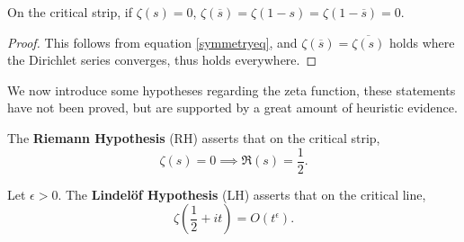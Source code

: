 \begin{corollary}
	On the critical strip, if $\zeta(s)=0$, $\zeta(\overline{s})=\zeta(1-s)=\zeta(1-\overline{s})=0.$
\end{corollary}
\begin{proof}
	This follows from equation \ref{symmetryeq}, and $\zeta(\overline{s})=\overline{\zeta(s)}$ holds where the Dirichlet series converges, thus holds everywhere.
\end{proof}
We now introduce some hypotheses regarding the zeta function, these statements have not been proved, but are supported by a great amount of heuristic evidence.
\begin{definition}
	The \textbf{Riemann Hypothesis} (RH) asserts that on the critical strip, \[
		\zeta(s) = 0 \implies \Re(s) = \frac{1}{2}. 
	\]
\end{definition}

\begin{definition}
	Let $\epsilon>0$. The \textbf{Lindel\"of Hypothesis} (LH) asserts that on the critical line, \[
		\zeta\left(\frac{1}{2}+it\right) = O(t^\epsilon).
	\]
\end{definition}